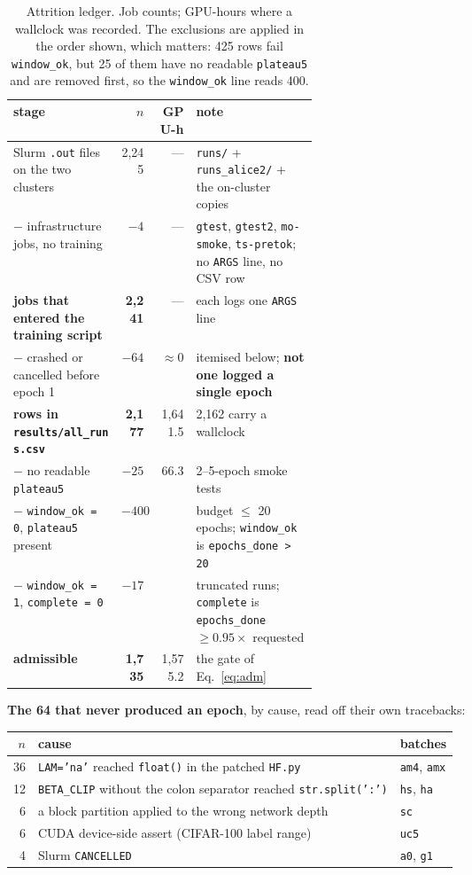 \documentclass[10pt,letterpaper]{article}
\newcommand{\plateau}{\texttt{plateau5}}
\newcommand{\arm}[1]{\texttt{#1}}
\begin{document}
\begin{table}[htbp]
\centering
\small
\caption{Attrition ledger. Job counts; GPU-hours where a wallclock was recorded. The exclusions
are applied in the order shown, which matters: 425 rows fail \texttt{window\_ok}, but 25 of them
have no readable \plateau{} and are removed first, so the \texttt{window\_ok} line reads 400.}
\label{tab:attrition}
\begin{tabular}{@{}l r r p{0.40\linewidth}@{}}
\toprule
stage & $n$ & GPU-h & note \\
\midrule
Slurm \texttt{.out} files on the two clusters & 2{,}245 & --- &
  \texttt{runs/} + \texttt{runs\_alice2/} + the on-cluster copies \\
$-$ infrastructure jobs, no training & $-4$ & --- &
  \arm{gtest}, \arm{gtest2}, \arm{mo-smoke}, \arm{ts-pretok}; no \texttt{ARGS} line, no CSV row \\
\textbf{jobs that entered the training script} & \textbf{2{,}241} & --- &
  each logs one \texttt{ARGS} line \\
$-$ crashed or cancelled before epoch 1 & $-64$ & $\approx$0 &
  itemised below; \textbf{not one logged a single epoch} \\
\textbf{rows in \texttt{results/all\_runs.csv}} & \textbf{2{,}177} & 1{,}641.5 &
  2{,}162 carry a wallclock \\
$-$ no readable \plateau{} & $-25$ & \multirow{3}{*}{66.3} & 2--5-epoch smoke tests \\
$-$ \texttt{window\_ok = 0}, \plateau{} present & $-400$ & &
  budget $\le$ 20 epochs; \texttt{window\_ok} is \texttt{epochs\_done > 20} \\
$-$ \texttt{window\_ok = 1}, \texttt{complete = 0} & $-17$ & &
  truncated runs; \texttt{complete} is
  \texttt{epochs\_done} $\ge 0.95 \times$ requested \\
\textbf{admissible} & \textbf{1{,}735} & 1{,}575.2 & the gate of Eq.~\ref{eq:adm} \\
\bottomrule
\end{tabular}
\end{table}

\textbf{The 64 that never produced an epoch}, by cause, read off their own tracebacks:

\begin{center}
\small
\begin{tabular}{@{}rll@{}}
\toprule
$n$ & cause & batches \\
\midrule
36 & \texttt{LAM='na'} reached \texttt{float()} in the patched \texttt{HF.py} &
  \arm{am4}, \arm{amx} \\
12 & \texttt{BETA\_CLIP} without the colon separator reached \texttt{str.split(':')} &
  \arm{hs}, \arm{ha} \\
6 & a block partition applied to the wrong network depth & \arm{sc} \\
6 & CUDA device-side assert (CIFAR-100 label range) & \arm{uc5} \\
4 & Slurm \texttt{CANCELLED} & \arm{a0}, \arm{g1} \\
\bottomrule
\end{tabular}
\end{center}
\end{document}
